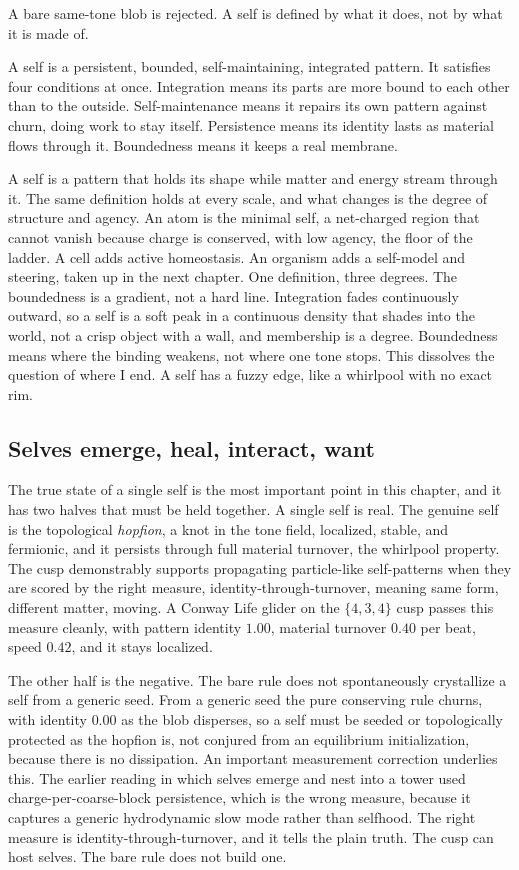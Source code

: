 A bare same-tone blob is rejected. A self is defined by what it does, not by what it is made of.

\begin{definition}[A self]
A self is a persistent, bounded, self-maintaining, integrated pattern. It satisfies four conditions at once. Integration means its parts are more bound to each other than to the outside. Self-maintenance means it repairs its own pattern against churn, doing work to stay itself. Persistence means its identity lasts as material flows through it. Boundedness means it keeps a real membrane.
\end{definition}

A self is a pattern that holds its shape while matter and energy stream through it. The same definition holds at every scale, and what changes is the degree of structure and agency. An atom is the minimal self, a net-charged region that cannot vanish because charge is conserved, with low agency, the floor of the ladder. A cell adds active homeostasis. An organism adds a self-model and steering, taken up in the next chapter. One definition, three degrees. The boundedness is a gradient, not a hard line. Integration fades continuously outward, so a self is a soft peak in a continuous density that shades into the world, not a crisp object with a wall, and membership is a degree. Boundedness means where the binding weakens, not where one tone stops. This dissolves the question of where I end. A self has a fuzzy edge, like a whirlpool with no exact rim.

\subsection{Selves emerge, heal, interact, want}

The true state of a single self is the most important point in this chapter, and it has two halves that must be held together. A single self is real. The genuine self is the topological \emph{hopfion}, a knot in the tone field, localized, stable, and fermionic, and it persists through full material turnover, the whirlpool property. The cusp demonstrably supports propagating particle-like self-patterns when they are scored by the right measure, identity-through-turnover, meaning same form, different matter, moving. A Conway Life glider on the $\{4,3,4\}$ cusp passes this measure cleanly, with pattern identity $1.00$, material turnover $0.40$ per beat, speed $0.42$, and it stays localized.

The other half is the negative. The bare rule does not spontaneously crystallize a self from a generic seed. From a generic seed the pure conserving rule churns, with identity $0.00$ as the blob disperses, so a self must be seeded or topologically protected as the hopfion is, not conjured from an equilibrium initialization, because there is no dissipation. An important measurement correction underlies this. The earlier reading in which selves emerge and nest into a tower used charge-per-coarse-block persistence, which is the wrong measure, because it captures a generic hydrodynamic slow mode rather than selfhood. The right measure is identity-through-turnover, and it tells the plain truth. The cusp can host selves. The bare rule does not build one.

